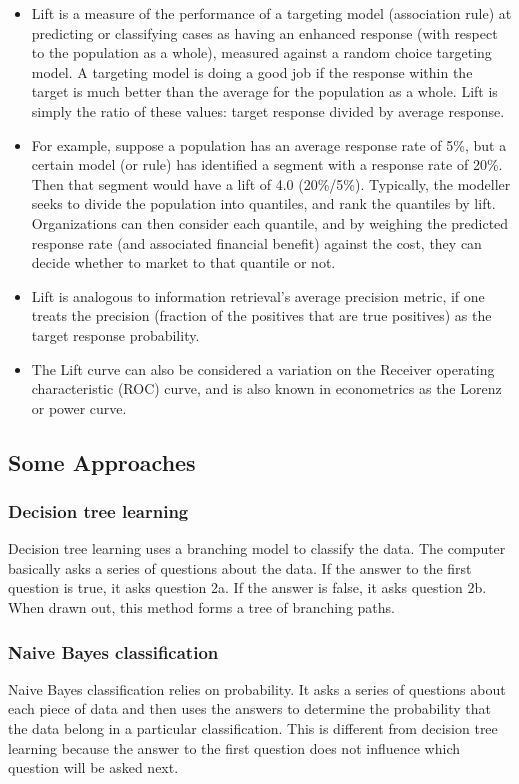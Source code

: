 \documentclass[]{report}
\begin{document}
\begin{itemize}
\item Lift is a measure of the performance of a targeting model (association rule) at predicting or classifying cases as having an enhanced response (with respect to the population as a whole), measured against a random choice targeting model. A targeting model is doing a good job if the response within the target is much better than the average for the population as a whole. Lift is simply the ratio of these values: target response divided by average response.
\item For example, suppose a population has an average response rate of 5\%, but a certain model (or rule) has identified a segment with a response rate of 20\%. Then that segment would have a lift of 4.0 (20\%/5\%).
Typically, the modeller seeks to divide the population into quantiles, and rank the quantiles by lift. Organizations can then consider each quantile, and by weighing the predicted response rate (and associated financial benefit) against the cost, they can decide whether to market to that quantile or not.
\item Lift is analogous to information retrieval's average precision metric, if one treats the precision (fraction of the positives that are true positives) as the target response probability.
\item The Lift curve can also be considered a variation on the Receiver operating characteristic (ROC) curve, and is also known in econometrics as the Lorenz or power curve.
\end{itemize}

\newpage
\subsection{Some Approaches}
\subsubsection*{Decision tree learning}
Decision tree learning uses a branching model to classify the data. The computer basically asks a series of questions about the data. If the answer to the first question is true, it asks question 2a. If the answer is false, it asks question 2b. When drawn out, this method forms a tree of branching paths.

\subsubsection*{Naive Bayes classification }
Naive Bayes classification relies on probability. It asks a series of questions about each piece of data and then uses the answers to determine the probability that the data belong in a particular classification. This is different from decision tree learning because the answer to the first question does not influence which question will be asked next.
\end{document}

